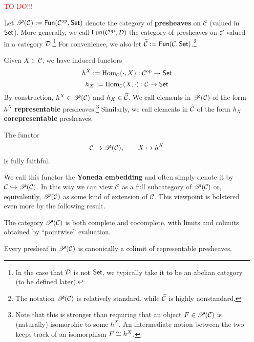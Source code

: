 \documentclass[11pt]{article}
\renewcommand{\C}{\mathcal{C}}
\begin{document}
\begin{theorem}
\textcolor{red}{TO DO!!!}
\end{theorem}

Let $\Pre(\C):=\Fun(\C^{\op},\Set)$ denote the category of \textbf{presheaves} on $\C$ (valued in $\operatorname{\mathsf{Set}}$). More generally, we call $\Fun(\C^{\op},\D)$ the category of presheaves on $\C$ valued in a category $\mathcal{D}$.\footnote{In the case that $\mathcal{D}$ is not $\operatorname{\mathsf{Set}}$, we typically take it to be an abelian category (to be defined later).} For convenience, we also let $\twid{\C}:=\Fun(\C,\Set)$.\footnote{The notation $\Pre(\C)$ is relatively standard, while $\twid{\C}$ is highly nonstandard.}

\begin{definition}
Given $X\in\C$, we have induced functors
$$h^X:=\Hom_{\C}(\cdot,X): \C^{\op}\to\Set$$
$$h_X:=\Hom_{\C}(X,\cdot): \C\to\Set$$
By construction, $h^X\in\Pre(\C)$ and $h_X\in\twid{\C}$. We call elements in $\Pre(\C)$ of the form $h^X$ \textbf{representable} presheaves.\footnote{Note that this is stronger than requiring that an object $F\in\Pre(\C)$ is (naturally) isomorphic to some $h^X$. An intermediate notion between the two keeps track of an isomorphism $F\cong h^X$.} Similarly, we call elements in $\twid{\C}$ of the form $h_X$ \textbf{corepresentable} presheaves.
\end{definition}

\begin{theorem}
The functor 
$$\C\to\Pre(\C),\qquad X\mapsto h^X$$
is fully faithful.
\end{theorem}

We call this functor the \textbf{Yoneda embedding} and often simply denote it by $\C\inj\Pre(\C)$. In this way we can view $\C$ as a full subcategory of $\Pre(\C)$ or, equivalently, $\Pre(\C)$ as some kind of extension of $\C$. This viewpoint is bolstered even more by the following result.

\begin{proposition}
The category $\Pre(\C)$ is both complete and cocomplete, with limits and colimits obtained by ``pointwise'' evaluation.
\end{proposition}

\begin{proposition}
Every presheaf in $\Pre(\C)$ is canonically a colimit of representable presheaves.
\end{proposition}
\end{document}
